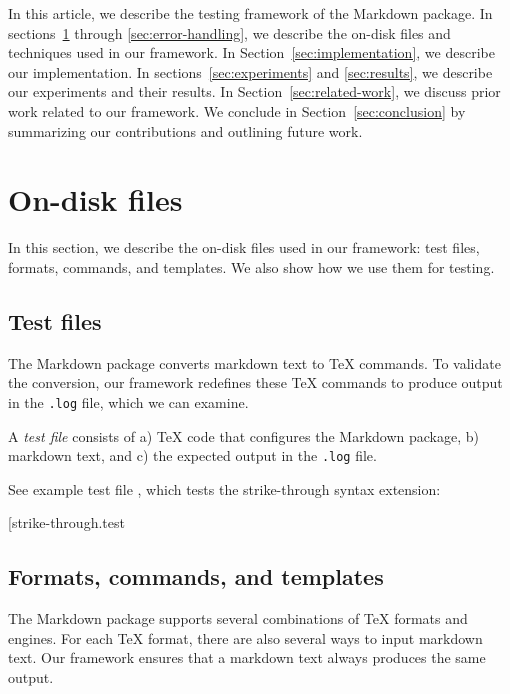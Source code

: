 \documentclass[final]{ltugboat}
\begin{document}
In this article, we describe the testing framework of the Markdown package. In sections~\ref{sec:on-disk-files} through \ref{sec:error-handling}, we describe the on-disk files and techniques used in our framework. In Section~\ref{sec:implementation}, we describe our implementation. In sections~\ref{sec:experiments} and \ref{sec:results}, we describe our experiments and their results. In Section~\ref{sec:related-work}, we discuss prior work related to our framework. We conclude in Section~\ref{sec:conclusion} by summarizing our contributions and outlining future work.

\section{On-disk files}
\label{sec:on-disk-files}

In this section, we describe the on-disk files used in our framework: test files, formats, commands, and templates. We also show how we use them for testing.

\subsection{Test files}
\label{sec:test-files}

The Markdown package converts markdown text to \TeX{} commands. To validate the conversion, our framework redefines these \TeX{} commands to produce output in the \texttt{.log} file, which we can examine.

A \emph{test file} consists of a) \TeX{} code that configures the Markdown package, b) markdown text, and c) the expected output in the \texttt{.log} file.

See example test file , which tests the strike-through syntax extension:

\smallskip
\noindent
\example*[{strike-through.test}

\subsection{Formats, commands, and templates}
\label{sec:formats-commands-and-templates}

The Markdown package supports several combinations of \TeX{} formats and engines. For each \TeX{} format, there are also several ways to input markdown text. Our framework ensures that a markdown text always produces the same output.
\end{document}
